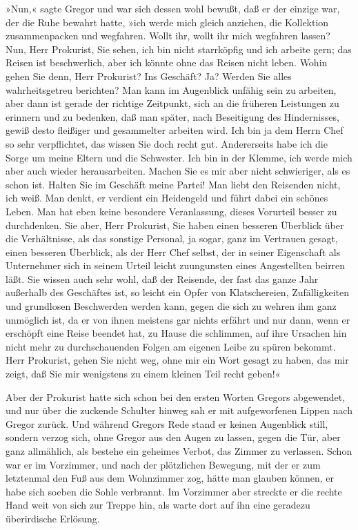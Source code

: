 »Nun,« sagte Gregor und war sich dessen wohl bewußt, daß er der einzige
war, der die Ruhe bewahrt hatte, »ich werde mich gleich anziehen, die
Kollektion zusammenpacken und wegfahren. Wollt ihr, wollt ihr mich
wegfahren lassen? Nun, Herr Prokurist, Sie sehen, ich bin nicht
starrköpfig und ich arbeite gern; das Reisen ist beschwerlich, aber ich
könnte ohne das Reisen nicht leben. Wohin gehen Sie denn, Herr
Prokurist? Ins Geschäft? Ja? Werden Sie alles wahrheitsgetreu berichten?
Man kann im Augenblick unfähig sein zu arbeiten, aber dann ist gerade
der richtige Zeitpunkt, sich an die früheren Leistungen zu erinnern und
zu bedenken, daß man später, nach Beseitigung des Hindernisses, gewiß
desto fleißiger und gesammelter arbeiten wird. Ich bin ja dem Herrn Chef
so sehr verpflichtet, das wissen Sie doch recht gut. Andererseits habe
ich die Sorge um meine Eltern und die Schwester. Ich bin in der Klemme,
ich werde mich aber auch wieder herausarbeiten. Machen Sie es mir aber
nicht schwieriger, als es schon ist. Halten Sie im Geschäft meine
Partei! Man liebt den Reisenden nicht, ich weiß. Man denkt, er verdient
ein Heidengeld und führt dabei ein schönes Leben. Man hat eben keine
besondere Veranlassung, dieses Vorurteil besser zu durchdenken. Sie
aber, Herr Prokurist, Sie haben einen besseren Überblick über die
Verhältnisse, als das sonstige Personal, ja sogar, ganz im Vertrauen
gesagt, einen besseren Überblick, als der Herr Chef selbst, der in
seiner Eigenschaft als Unternehmer sich in seinem Urteil leicht
zuungunsten eines Angestellten beirren läßt. Sie wissen auch sehr wohl,
daß der Reisende, der fast das ganze Jahr außerhalb des Geschäftes ist,
so leicht ein Opfer von Klatschereien, Zufälligkeiten und grundlosen
Beschwerden werden kann, gegen die sich zu wehren ihm ganz unmöglich
ist, da er von ihnen meistens gar nichts erfährt und nur dann, wenn er
erschöpft eine Reise beendet hat, zu Hause die schlimmen, auf ihre
Ursachen hin nicht mehr zu durchschauenden Folgen am eigenen Leibe zu
spüren bekommt. Herr Prokurist, gehen Sie nicht weg, ohne mir ein Wort
gesagt zu haben, das mir zeigt, daß Sie mir wenigstens zu einem kleinen
Teil recht geben!«

Aber der Prokurist hatte sich schon bei den ersten Worten Gregors
abgewendet, und nur über die zuckende Schulter hinweg sah er mit
aufgeworfenen Lippen nach Gregor zurück. Und während Gregors Rede stand
er keinen Augenblick still, sondern verzog sich, ohne Gregor aus den
Augen zu lassen, gegen die Tür, aber ganz allmählich, als bestehe ein
geheimes Verbot, das Zimmer zu verlassen. Schon war er im Vorzimmer, und
nach der plötzlichen Bewegung, mit der er zum letztenmal den Fuß aus dem
Wohnzimmer zog, hätte man glauben können, er habe sich soeben die Sohle
verbrannt. Im Vorzimmer aber streckte er die rechte Hand weit von sich
zur Treppe hin, als warte dort auf ihn eine geradezu überirdische
Erlösung.

